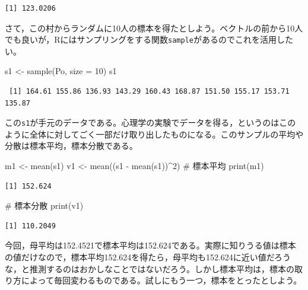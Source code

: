 \documentclass[
  a4paper,
]{ltjsbook}
\newenvironment{Shaded}{\begin{snugshade}}{\end{snugshade}}
\newcommand{\AttributeTok}[1]{\textcolor[rgb]{0.40,0.45,0.13}{#1}}
\newcommand{\CommentTok}[1]{\textcolor[rgb]{0.37,0.37,0.37}{#1}}
\newcommand{\DecValTok}[1]{\textcolor[rgb]{0.68,0.00,0.00}{#1}}
\newcommand{\FunctionTok}[1]{\textcolor[rgb]{0.28,0.35,0.67}{#1}}
\newcommand{\NormalTok}[1]{\textcolor[rgb]{0.00,0.23,0.31}{#1}}
\newcommand{\OtherTok}[1]{\textcolor[rgb]{0.00,0.23,0.31}{#1}}
\newcommand{\SpecialCharTok}[1]{\textcolor[rgb]{0.37,0.37,0.37}{#1}}
\begin{document}
\begin{verbatim}
[1] 123.0206
\end{verbatim}

さて，この村からランダムに10人の標本を得たとしよう。ベクトルの前から10人でも良いが，Rにはサンプリングをする関数\texttt{sample}があるのでこれを活用したい。

\begin{Shaded}
\begin{Highlighting}[]
\NormalTok{s1 }\OtherTok{\textless{}{-}} \FunctionTok{sample}\NormalTok{(Po, }\AttributeTok{size =} \DecValTok{10}\NormalTok{)}
\NormalTok{s1}
\end{Highlighting}
\end{Shaded}

\begin{verbatim}
 [1] 164.61 155.86 136.93 143.29 160.43 168.87 151.50 155.17 153.71 135.87
\end{verbatim}

この\texttt{s1}が手元のデータである。心理学の実験でデータを得る，というのはこのように全体に対してごく一部だけ取り出したものになる。このサンプルの平均や分散は標本平均，標本分散である。

\begin{Shaded}
\begin{Highlighting}[]
\NormalTok{m1 }\OtherTok{\textless{}{-}} \FunctionTok{mean}\NormalTok{(s1)}
\NormalTok{v1 }\OtherTok{\textless{}{-}} \FunctionTok{mean}\NormalTok{((s1 }\SpecialCharTok{{-}} \FunctionTok{mean}\NormalTok{(s1))}\SpecialCharTok{\^{}}\DecValTok{2}\NormalTok{)}
\CommentTok{\# 標本平均}
\FunctionTok{print}\NormalTok{(m1)}
\end{Highlighting}
\end{Shaded}

\begin{verbatim}
[1] 152.624
\end{verbatim}

\begin{Shaded}
\begin{Highlighting}[]
\CommentTok{\# 標本分散}
\FunctionTok{print}\NormalTok{(v1)}
\end{Highlighting}
\end{Shaded}

\begin{verbatim}
[1] 110.2049
\end{verbatim}

今回，母平均は152.4521で標本平均は152.624である。実際に知りうる値は標本の値だけなので，標本平均152.624を得たら，母平均も152.624に近い値だろうな，と推測するのはおかしなことではないだろう。しかし標本平均は，標本の取り方によって毎回変わるものである。試しにもう一つ，標本をとったとしよう。
\end{document}
